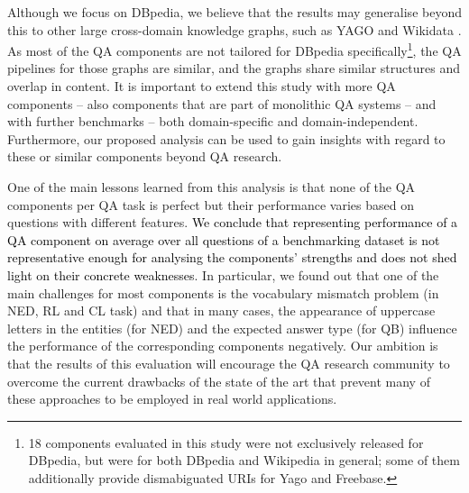 \documentclass[sigconf,edbt]{acmart-edbt2019}
\begin{document}
Although we focus on DBpedia, we believe that the results may generalise beyond this to other large cross-domain knowledge graphs, such as YAGO \cite{DBLP:conf/www/SuchanekKW07} and Wikidata \cite{DBLP:conf/www/Vrandecic12}. As most of the QA components are not tailored for DBpedia specifically\footnote{18 components evaluated in this study were not exclusively released for DBpedia, but were for both DBpedia and Wikipedia in general; some of them additionally provide dismabiguated URIs for Yago and Freebase.}, the QA pipelines for those graphs are similar, and the graphs share similar structures and overlap in content. It is important to extend this study with more QA components -- also components that are part of monolithic QA systems -- and with further benchmarks -- both domain-specific and domain-independent. Furthermore, our proposed analysis can be used to gain insights with regard to these or similar components beyond QA research.

One of the main lessons learned from this analysis is that none of the QA components per QA task is perfect but their performance varies based on questions with different features. \textcolor{black}{We conclude that representing performance of a QA component on average over all questions of a benchmarking dataset is not representative enough for analysing the components' strengths and does not shed light on their concrete weaknesses}. In particular, we found out that one of the main challenges for most components is the vocabulary mismatch problem (in NED, RL and CL task) and that in many cases, the appearance of uppercase letters in the entities (for NED) and the expected answer type (for QB) influence the performance of the corresponding components negatively.
Our ambition is that the results of this evaluation will encourage the QA research community to overcome the current drawbacks of the state of the art that prevent many of these approaches to be employed in real world applications.

\balance




\end{document}

